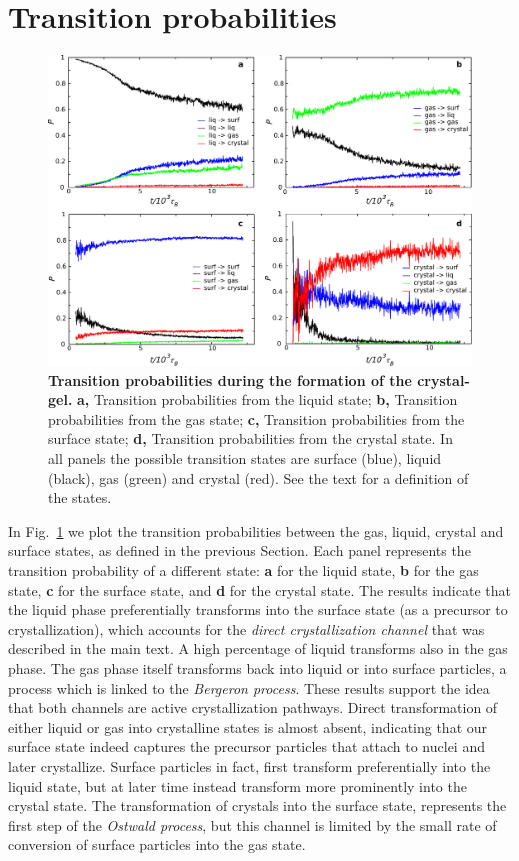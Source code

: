 \section*{Transition probabilities}
\begin{figure}
 \centering
 \includegraphics[width=14cm]{./sfig1.pdf}
 \caption{{\bf Transition probabilities during the formation of the crystal-gel.}
 {\bf a,} Transition probabilities from the liquid state;
 {\bf b,} Transition probabilities from the gas state;
 {\bf c,} Transition probabilities from the surface state;
 {\bf d,} Transition probabilities from the crystal state. In all panels the possible
 transition states are surface (blue), liquid (black), gas (green) and crystal (red).
 See the text for a definition of the states.
 }
 \label{fig:probabilities}
\end{figure}

In Fig.~\ref{fig:probabilities} we plot the transition probabilities between the gas, liquid, crystal
and surface states, as defined in the previous Section. Each panel represents the transition probability
of a different state: {\bf a} for the liquid state, {\bf b} for the gas state, {\bf c} for the surface state,
and {\bf d} for the crystal state. The results indicate that the liquid phase preferentially transforms into
the surface state (as a precursor to crystallization), which accounts for the \emph{direct crystallization channel}
that was described in the main text. A high percentage of liquid transforms also in the gas phase. The gas phase itself
transforms back into liquid or into surface particles, a process which
is linked to the \emph{Bergeron process}. These results support the idea that both channels are active
crystallization pathways. Direct transformation of either liquid or gas into crystalline states is almost absent,
indicating that our surface state indeed captures the precursor particles that attach to nuclei and later crystallize.
Surface particles in fact, first transform preferentially into the liquid state, but at later time instead transform
more prominently into the crystal state. The transformation of crystals into the surface state, represents the first
step of the \emph{Ostwald process}, but this channel is limited by the small rate of conversion of surface particles
into the gas state.


